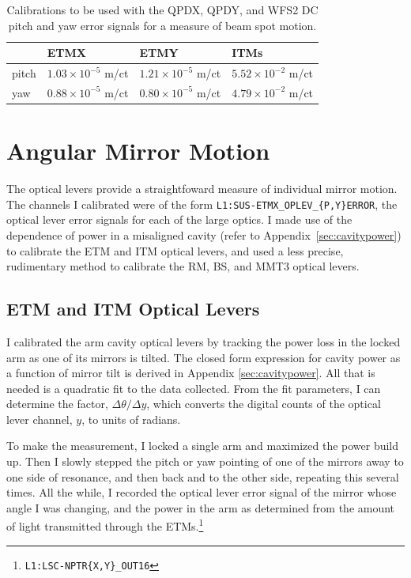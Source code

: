 \begin{table}
\centering
\caption[Beam spot motion calibrations]{Calibrations to be used with
 the QPDX, QPDY, and WFS2 DC pitch and yaw error signals for a
 measure of beam spot motion.} 
\begin{tabular}{l l l l}
\hline
         & ETMX & ETMY & ITMs \\
\hline
pitch & $1.03\times10^{-5}$ m/ct & $1.21\times10^{-5}$ m/ct & $5.52\times10^{-2}$ m/ct \\
yaw & $0.88\times10^{-5}$ m/ct & $0.80\times10^{-5}$ m/ct & $4.79\times10^{-2}$ m/ct \\
\hline
\end{tabular}
\label{table:bsmcal}
\end{table}



\section{Angular Mirror Motion}
\label{sec:oplevcal}
The optical levers provide a straightfoward measure of individual
mirror motion. The channels I calibrated were of the form
\texttt{L1:SUS-ETMX\_OPLEV\_\{P,Y\}ERROR}, the optical lever error
signals for each of the large optics. I made use of the dependence of
power in a misaligned cavity (refer to Appendix~\ref{sec:cavitypower})
to calibrate the ETM and ITM optical levers, and used a less precise,
rudimentary method to calibrate the RM, BS, and MMT3 optical levers.

\subsection{ETM and ITM Optical Levers} 
I calibrated the arm cavity optical levers by tracking the power loss
in the locked arm as one of its mirrors is tilted. The closed form
expression for cavity power as a function of mirror tilt is derived in
Appendix \ref{sec:cavitypower}. All that is needed is a quadratic fit
to the data collected. From the fit parameters, I can determine the
factor, $\Delta \theta / \Delta y$, which converts the digital counts
of the optical lever channel, $y$, to units of radians.

To make the measurement, I locked a single arm and maximized the power
build up. Then I slowly stepped the pitch or yaw pointing of one of
the mirrors away to one side of resonance, and then back and to the
other side, repeating this several times. All the while, I recorded
the optical lever error signal of the mirror whose angle I was
changing, and the power in the arm as determined from the amount of
light transmitted through the
ETMs.\footnote{\texttt{L1:LSC-NPTR\{X,Y\}\_OUT16}}

